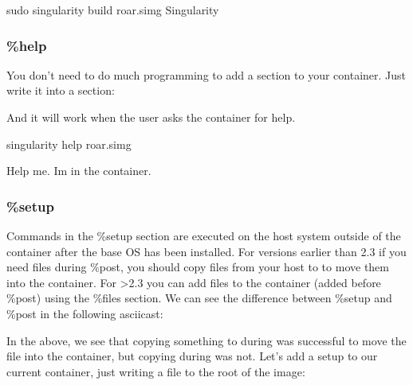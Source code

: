 \documentclass[letterpaper,10pt,english]{sphinxmanual}
\begin{document}
%
\begin{sphinxVerbatim}[commandchars=\\\{\}]
\PYGZdl{} sudo singularity build roar.simg Singularity
\end{sphinxVerbatim}


\subsubsection{\%help}
\label{\detokenize{container_recipes:help}}\label{\detokenize{container_recipes:help-docs}}
You don’t need to do much programming to add a 
section to your container. Just write it into a section:

%
\begin{sphinxVerbatim}[commandchars=\\\{\}]
 

 



  
\end{sphinxVerbatim}

And it will work when the user asks the container for help.

%
\begin{sphinxVerbatim}[commandchars=\\\{\}]
\PYGZdl{} singularity help roar.simg

Help me. I\PYGZsq{}m in the container.
\end{sphinxVerbatim}


\subsubsection{\%setup}
\label{\detokenize{container_recipes:setup}}
Commands in the \%setup section are executed on the host system outside
of the container after the base OS has been installed. For versions
earlier than 2.3 if you need files during \%post, you should copy files
from your host to  to move them into the
container. For \textgreater{}2.3 you can add files to the container (added before
\%post) using the \%files section. We can see the difference between
\%setup and \%post in the following asciicast:

In the above, we see that copying something to  during  was successful
to move the file into the container, but copying during  was not. Let’s
add a setup to our current container, just writing a file to the root
of the image:
\end{document}
